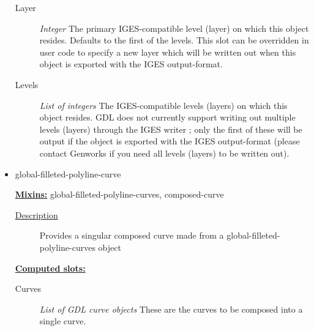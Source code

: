 \documentclass [11pt]{book}
\begin{document}
\begin{itemize}
\begin{description}
\item [Layer]
\emph{Integer} The primary IGES-compatible level (layer) on which this object resides. Defaults to the first of the levels. This
slot can be overridden in user code to specify a new layer which will be written out when this object is exported with the IGES
output-format.


\item [Levels]
\emph{List of integers} The IGES-compatible levels (layers) on which this object resides. GDL does not currently support writing
out multiple levels (layers) through the IGES writer ; only the first of these will be output if the object is exported with
the IGES output-format (please contact Genworks if you need all levels (layers) to be written out).


\end{description}







\item {}global-filleted-polyline-curve


\textbf{
\underline{Mixins:}} global-filleted-polyline-curves, composed-curve





\begin{description}

\item [
\underline{Description}]


Provides a singular composed curve made 
from a global-filleted-polyline-curves object



\end{description}








\textbf{
\underline{Computed slots:}}

\begin{description}

\item [Curves]
\emph{List of GDL curve objects} These are the curves to be composed into a single curve.


\end{description}








\end{itemize}
\end{document}
